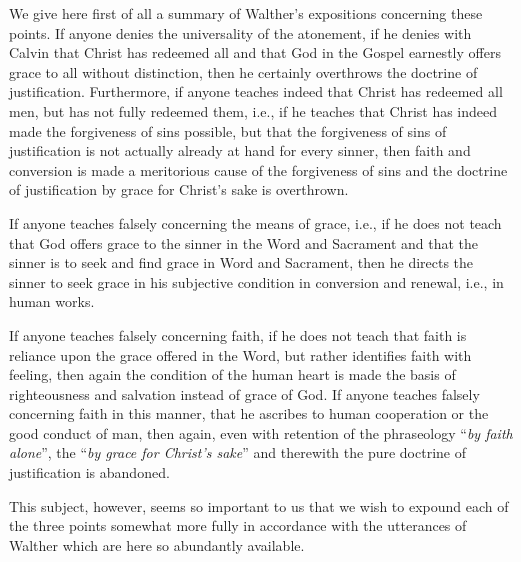                 We give here first of all a summary of Walther’s expositions concerning these points.  If anyone denies the universality of the atonement, if he denies with Calvin that Christ has redeemed all and that God in the Gospel earnestly offers grace to all without distinction, then he certainly overthrows the doctrine of justification.  Furthermore, if anyone teaches indeed that Christ has redeemed all men, but has not fully redeemed them, i.e., if he teaches that Christ has indeed made the forgiveness of sins possible, but that the forgiveness of sins of justification is not actually already at hand for every sinner, then faith and conversion is made a meritorious cause of the forgiveness of sins and the doctrine of justification by grace for Christ’s sake is overthrown.\par  If anyone teaches falsely concerning the means of grace, i.e., if he does not teach that God offers grace to the sinner in the Word and Sacrament and that the sinner is to seek and find grace in Word and Sacrament, then he directs the sinner to seek grace in his subjective condition in conversion and renewal, i.e., in human works. \par  If anyone teaches falsely concerning faith, if he does not teach that faith is reliance upon the grace offered in the Word, but rather identifies faith with feeling, then again the condition of the human heart is made the basis of righteousness and salvation instead of grace of God.  If anyone teaches falsely concerning faith in this manner, that he ascribes to human cooperation or the good conduct of man, then again, even with retention of the phraseology “\textit{by faith alone}”, the “\textit{by grace for Christ’s sake}” and therewith the pure doctrine of justification is abandoned.

                This subject, however, seems so important to us that we wish to expound each of the three points somewhat more fully in accordance with the utterances of Walther which are here so abundantly available.


